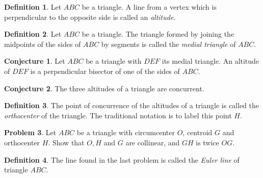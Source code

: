 \documentclass{tufte-handout}
\theoremstyle{definition}
\newtheorem{problem}{Problem}[section]
\newtheorem{conjecture}[problem]{Conjecture}
\newtheorem*{definition}{Definition}
\begin{document}
\begin{definition}\label{defn:altitude} Let $ABC$ be a triangle. A line from a vertex which is perpendicular to the opposite side is called an \emph{altitude}.
\end{definition}

\begin{definition}\label{defn:medial-triangle} Let $ABC$ be a triangle. The triangle formed by joining the midpoints of the sides of $ABC$ by segments is called the \emph{medial triangle} of $ABC$.
\end{definition}

\begin{conjecture} Let $ABC$ be a triangle with $DEF$ its medial triangle. An altitude of $DEF$ is a perpendicular bisector of one of the sides of $ABC$.
\end{conjecture}

\begin{conjecture}\label{conj:altitudes-concurrent} The three altitudes of a triangle are concurrent.
\end{conjecture}

\begin{definition}\label{defn:orthocenter} The point of concurrence of the altitudes of a triangle is called the \emph{orthocenter} of the triangle. The traditional notation is to label this point $H$.
\end{definition}


\begin{problem}\label{prob:Euler-line}
Let $ABC$ be a triangle with circumcenter $O$, centroid $G$ and orthocenter $H$. Show that $O, H$ and $G$ are collinear, and $GH$ is twice $OG$.
\end{problem}

\begin{definition}\label{defn:Euler-line}
The line found in the last problem is called the \emph{Euler line} of triangle $ABC$.
\end{definition}


\vfill
\end{document}
